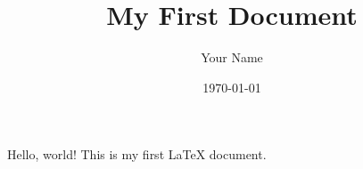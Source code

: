 \documentclass{article}
\title{My First Document}
\author{Your Name}
\date{\today}
\begin{document}
\maketitle

Hello, world! This is my first LaTeX document.
\end{document}
